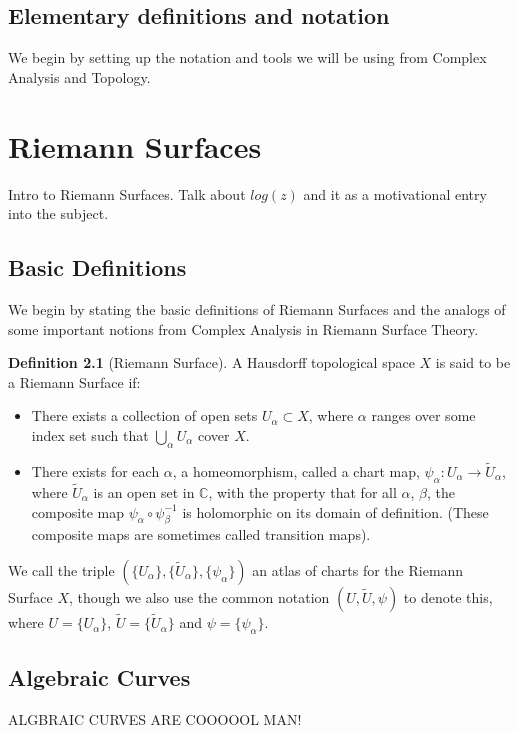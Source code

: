 \documentclass[a4paper,12pt]{report}
\theoremstyle{plain}
\theoremstyle{definition}
\newtheorem{defn}[thm]{Definition}
\begin{document}
\section{Elementary definitions and notation}
We begin by setting up the notation and tools we will be using from Complex Analysis and Topology.

\chapter{Riemann Surfaces}

Intro to Riemann Surfaces. Talk about $log(z)$ and it as a motivational entry into the subject.


\section{Basic Definitions}\label{bdefns}

We begin by stating the basic definitions of Riemann Surfaces and the 
analogs of some important notions from Complex Analysis in Riemann Surface
Theory.

\begin{defn}[Riemann Surface]\label{rsdefn}
A Hausdorff topological space $X$ is said to be a Riemann Surface if:
\begin{itemize}
\item There exists a collection of open sets $U_{\alpha} \subset X$, where
  $
\alpha$ 
ranges over some index set such that $\bigcup\limits_{\alpha} U_{\alpha}$
cover 
$X$.
\item There exists for each $\alpha$, a homeomorphism, called a chart map,
  $ \psi_{\alpha}\colon U_{\alpha} \rightarrow \tilde{U}_{\alpha}$, where
$\tilde{U}_{\alpha}$ is 
  an open set in $\mathbb{C}$, with the property that for all $\alpha$,
  $\beta$, the composite map $\psi_{\alpha} \circ \psi_{\beta}^{-1}$ is
  holomorphic on its 
domain of 
definition. (These composite maps are sometimes called transition maps).
\end{itemize}
We call the triple $(\{U_\alpha\},\{\tilde{U}_{\alpha}\},
\{\psi_\alpha\})$ an 
atlas of 
charts for the Riemann Surface $X$, though we also use the common
notation $(U,
\tilde{U}, \psi)$ to denote this, where $U=\{U_\alpha\}$,
$\tilde{U}=\{\tilde{U}
_{\alpha}\}$ and $\psi=\{\psi_\alpha\}$.
\end{defn}


\section{Algebraic Curves}\label{algcurv}
ALGBRAIC CURVES ARE COOOOOL MAN!
\end{document}

